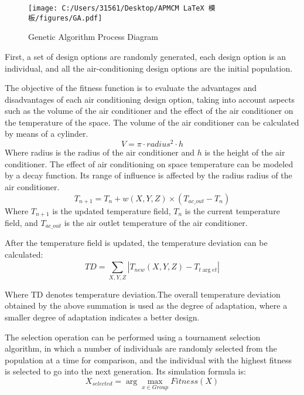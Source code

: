 \documentclass{apmcmthesis}
\begin{document}
\begin{figure}[H]
	\centering
	\texttt{[image: C:/Users/31561/Desktop/APMCM LaTeX 模板/figures/GA.pdf]}%
	\caption{Genetic Algorithm Process Diagram} %
	\label{}
\end{figure}

First, a set of design options are randomly generated, each design option is an individual, and all the air-conditioning design options are the initial population.

The objective of the fitness function is to evaluate the advantages and disadvantages of each air conditioning design option, taking into account aspects such as the volume of the air conditioner and the effect of the air conditioner on the temperature of the space. The volume of the air conditioner can be calculated by means of a cylinder.
\begin{equation}
	V = \pi  \cdot radiu{s^2} \cdot h
\end{equation}
Where radius is the radius of the air conditioner and $h$ is the height of the air conditioner.
The effect of air conditioning on space temperature can be modeled by a decay function. Its range of influence is affected by the radius radius of the air conditioner.
\begin{equation}
	{T_{n + 1}} = {T_n} + w(X,Y,Z) \times \left( {{T_{ac\_out}} - {T_n}} \right)
\end{equation}
Where ${T_{n + 1}}$ is the updated temperature field, ${T_n}$  is the current temperature field, and ${T_{ac\_out}}$ is the air outlet temperature of the air conditioner.

After the temperature field is updated, the temperature deviation can be calculated:
\begin{equation}TD= \sum\limits_{X,Y,Z}^{} {\left| {{T_{new}}\left( {X,Y,Z} \right) - {T_{t\arg et}}} \right|} \end{equation}

Where TD denotes temperature deviation.The overall temperature deviation obtained by the above summation is used as the degree of adaptation, where a smaller degree of adaptation indicates a better design.

The selection operation can be performed using a tournament selection algorithm, in which a number of individuals are randomly selected from the population at a time for comparison, and the individual with the highest fitness is selected to go into the next generation. Its simulation formula is:
\begin{equation}
	{X_{selected}} = \arg {\max _{x \in Group}}Fitness(X)
\end{equation}
\end{document}

